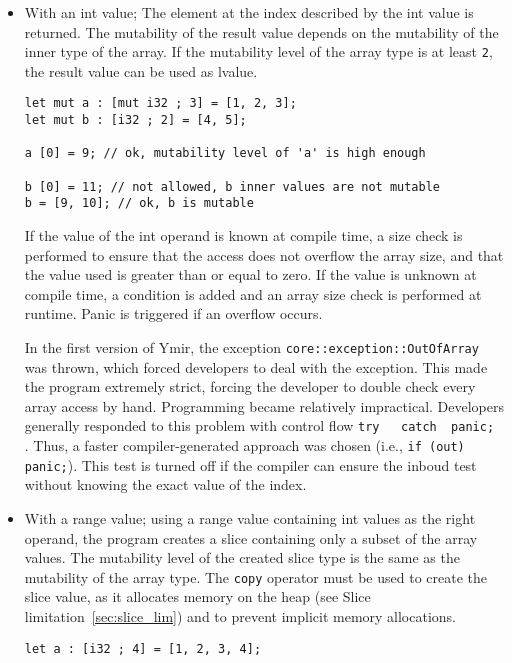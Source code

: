 \begin{itemize}
\item With an int value; The element at the index described by the int value is
  returned. The mutability of the result value depends on the mutability of the
  inner type of the array. If the mutability level of the array type is at least
  \texttt{2}, the result value can be used as lvalue.

  \begin{lstlisting}[style=coloredverbatim]
let mut a : [mut i32 ; 3] = [1, 2, 3];
let mut b : [i32 ; 2] = [4, 5];

a [0] = 9; // ok, mutability level of 'a' is high enough

b [0] = 11; // not allowed, b inner values are not mutable
b = [9, 10]; // ok, b is mutable
  \end{lstlisting}

  If the value of the int operand is known at compile time, a size check is
  performed to ensure that the access does not overflow the array size, and that
  the value used is greater than or equal to zero. If the value is unknown at
  compile time, a condition is added and an array size check is performed at
  runtime. Panic is triggered if an overflow occurs.

  In the first version of Ymir, the exception
  \texttt{core::exception::OutOfArray} was thrown, which forced developers to
  deal with the exception. This made the program extremely strict, forcing the
  developer to double check every array access by hand. Programming became
  relatively impractical. Developers generally responded to this problem with
  control flow \texttt{try { } catch { panic; }}. Thus, a faster
  compiler-generated approach was chosen (i.e., \texttt{if (out) panic;}). This
  test is turned off if the compiler can ensure the inboud test without knowing
  the exact value of the index.

\item With a range value; using a range value containing int values as the right
  operand, the program creates a slice containing only a subset of the array
  values. The mutability level of the created slice type is the same as the
  mutability of the array type. The \texttt{copy} operator must be used to create
  the slice value, as it allocates memory on the heap (see Slice
  limitation~\ref{sec:slice_lim}) and to prevent implicit memory allocations.

  \begin{lstlisting}[style=coloredverbatim]
let a : [i32 ; 4] = [1, 2, 3, 4];


\end{lstlisting}
\end{itemize}
